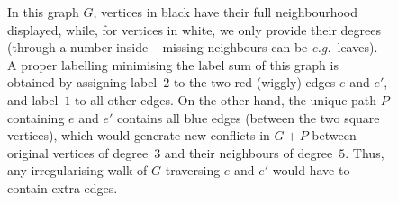 \documentclass[a4paper,11pt,dvipsnames]{elsarticle}
\newcommand{\sam}[1]{\todo[size=\tiny,color=red!20!white]{\textbf{Sam:} #1}}
\newcommand{\sam}[1]{}
\begin{document}
\begin{figure}[t]
{
}
	
\caption{In this graph $G$, vertices in black have their full neighbourhood displayed, while, for vertices in white, we only provide their degrees (through a number inside -- missing neighbours can be \textit{e.g.}~leaves). A proper labelling minimising the label sum of this graph is obtained by assigning label~$2$ to the two red (wiggly) edges $e$ and $e'$, and label~$1$ to all other edges. On the other hand, the unique path $P$ containing $e$ and $e'$ contains all blue edges (between the two square vertices), which would generate new conflicts in $G+P$ between original vertices of degree~$3$ and their neighbours of degree~$5$. Thus, any irregularising walk of $G$ traversing $e$ and $e'$ would have to contain extra edges.}
\label{figure:hard-to-connect}
\end{figure}
\end{document}
